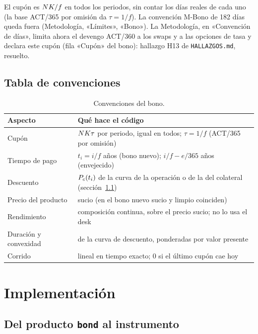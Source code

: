 \begin{diferencia}
  El cupón es $NK/f$ en todos los periodos, sin contar los días reales de cada uno (la base ACT/365 por
  omisión da $\tau=1/f$). La convención M-Bono de 182 días queda fuera (Metodología, «Límites», «Bono»). La Metodología, en «Convención de días», limita ahora el devengo ACT/360 a los swaps y a las opciones de tasa y
  declara este cupón (fila «Cupón» del bono): hallazgo H13 de \texttt{HALLAZGOS.md}, resuelto.
\end{diferencia}

\subsection{Tabla de convenciones}

\begin{table}[ht]
\centering
\begin{tabular}{>{\raggedright\arraybackslash}p{}>{\raggedright\arraybackslash}p{}}
\toprule
Aspecto & Qué hace el código \\
\midrule
Cupón & $NK\tau$ por periodo, igual en todos; $\tau=1/f$ (ACT/365 por omisión) \\
Tiempo de pago & $t_i=i/f$ años (bono nuevo); $i/f-e/365$ años (envejecido) \\
Descuento & $P_{c}(t_i)$ de la curva de la operación o de la del colateral (sección~\ref{sec:cap06-desk}) \\
Precio del producto & sucio (en el bono nuevo sucio y limpio coinciden) \\
Rendimiento & composición continua, sobre el precio sucio; no lo usa el desk \\
Duración y convexidad & de la curva de descuento, ponderadas por valor presente \\
Corrido & lineal en tiempo exacto; 0 si el último cupón cae hoy \\
\bottomrule
\end{tabular}
\caption{Convenciones del bono.}\label{tab:cap06-convenciones}
\end{table}

\section{Implementación}\label{sec:cap06-implementacion}

\subsection{Del producto \texttt{bond} al instrumento}\label{sec:cap06-desk}

